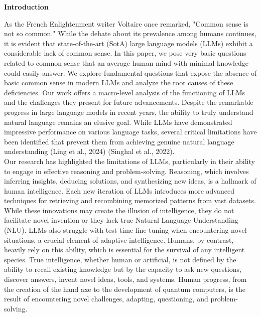 \documentclass[11pt]{scrartcl}
\begin{document}
\vspace{1cm}

\begin{huge}
\textbf{Introduction}
\end{huge}
As the French Enlightenment writer Voltaire once remarked, "Common sense is not so common." While the debate about its prevalence among humans continues, it is evident that state-of-the-art (SotA) large language models (LLMs) exhibit a considerable lack of common sense. In this paper, we pose very basic questions related to common sense that an average human mind with minimal knowledge could easily answer. We explore fundamental questions that expose the absence of basic common sense in modern LLMs and analyze the root causes of these deficiencies. Our work offers a macro-level analysis of the functioning of LLMs and the challenges they present for future advancements. Despite the remarkable progress in large language models in recent years, the ability to truly understand natural language remains an elusive goal. While LLMs have demonstrated impressive performance on various language tasks, several critical limitations have been identified that prevent them from achieving genuine natural language understanding (Ling et al., 2024)\cite{ref6} (Singhal et al., 2022)\cite{ref7}. \\

Our research has highlighted the limitations of LLMs, particularly in their ability to engage in effective reasoning and problem-solving. Reasoning, which involves inferring insights, deducing solutions, and synthesizing new ideas, is a hallmark of human intelligence. Each new iteration of LLMs introduces more advanced techniques for retrieving and recombining memorized patterns from vast datasets. While these innovations may create the illusion of intelligence, they do not facilitate novel invention or they lack true Natural Language Understanding (NLU). LLMs also struggle with test-time fine-tuning when encountering novel situations, a crucial element of adaptive intelligence. Humans, by contrast, heavily rely on this ability, which is essential for the survival of any intelligent species. True intelligence, whether human or artificial, is not defined by the ability to recall existing knowledge but by the capacity to ask new questions, discover answers, invent novel ideas, tools, and systems. Human progress, from the creation of the hand axe to the development of quantum computers, is the result of encountering novel challenges, adapting, questioning, and problem-solving.\\
\end{document}
